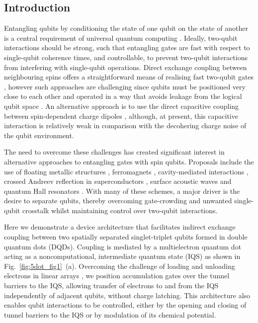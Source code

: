 \subsection{Introduction} 
Entangling qubits by conditioning the state of one qubit on the state of another is a central requirement of universal quantum computing \cite{divcrit1, divcrit2}. Ideally, two-qubit interactions should be strong, such that entangling gates are fast with respect to single-qubit coherence times, and controllable, to prevent two-qubit interactions from interfering with single-qubit operations.  Direct exchange coupling between neighbouring spins offers a straightforward means of realising fast two-qubit gates \cite{burkard,petta,silicontwoqubit,controlexchange}, however such approaches are challenging since qubits must be positioned very close to each other \cite{srinivasa} and operated in a way that avoids leakage from the logical qubit space \cite{wardrop,leakage}. An alternative approach is to use the direct capacitive coupling between spin-dependent charge dipoles \cite{Shulman202,weperen,taylornature}, although, at present, this capacitive interaction is relatively weak in comparison with the decohering charge noise of the qubit environment.

The need to overcome these challenges has created significant interest in alternative approaches to entangling gates with spin qubits. Proposals include the use of floating metallic structures \cite{floatinggate}, ferromagnets \cite{ferromagnet}, cavity-mediated interactions \cite{QED,petersson,dispersivewallraff}, crossed Andreev reflection in superconductors \cite{andreev}, surface acoustic waves \cite{SAWtheory,SAWexp,SAWexp2}  and quantum Hall resonators \cite{quantumhall, dohertyqhe}. With many of these schemes, a major driver is the desire to separate qubits, thereby overcoming gate-crowding and unwanted single-qubit crosstalk whilst maintaining control over two-qubit interactions. 

Here we demonstrate a device architecture that facilitates indirect exchange coupling between two spatially separated singlet-triplet qubits formed in double quantum dots (DQDs). Coupling is mediated by a multielectron quantum dot acting as a noncomputational, intermediate quantum state (IQS) \cite{Malinowski, jelena1, bluhm, srinivasa} as shown in Fig.~\ref{fig:5dot_fig1}~(a). Overcoming the challenge of loading and unloading electrons in linear arrays \cite{tarucha5dot}, we position accumulation gates over the tunnel barriers to the IQS, allowing transfer of electrons to and from the IQS independently of adjacent qubits, without charge latching. This architecture also enables qubit interactions to be controlled, either by the opening and closing of tunnel barriers to the IQS or by modulation of its chemical potential.

